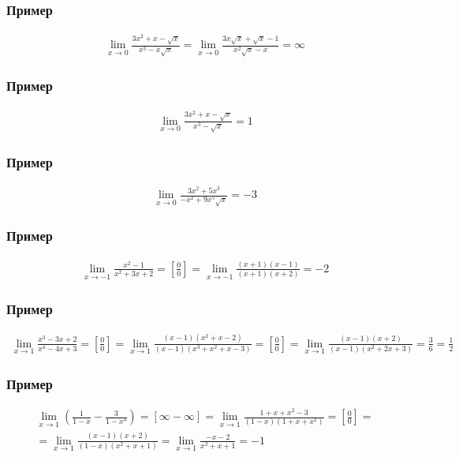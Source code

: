 \documentclass{article}
\begin{document}
\subsubsection{Пример}
\begin{gather*}
    \lim_{x \to 0} \frac{3x^2 + x - \sqrt{x}}{x^3 - x \sqrt{x}} =
    \lim_{x \to 0} \frac{3x \sqrt{x} + \sqrt{x} - 1}{x^2 \sqrt{x} - x} = \infty
\end{gather*}

\subsubsection{Пример}
\begin{gather*}
    \lim_{x \to 0} \frac{3x^2 + x - \sqrt{x}}{x^3 - \sqrt{x}} = 1
\end{gather*}

\subsubsection{Пример}
\begin{gather*}
    \lim_{x \to 0} \frac{3x^2 + 5x^3}{-x^2 + 9x^5 \sqrt{x}} = -3    
\end{gather*}

\subsubsection{Пример}
\begin{gather*}
    \lim_{x \to -1} \frac{x^2 - 1}{x^2 + 3x + 2} = 
    \left[ \frac{0}{0} \right] =
    \lim_{x \to -1} \frac{(x + 1)(x - 1)}{(x + 1)(x + 2)} = -2
\end{gather*}

\subsubsection{Пример}
\begin{gather*}
    \lim_{x \to 1} \frac{x^3 - 3x + 2}{x^4 - 4x + 3} =
    \left[ \frac{0}{0} \right] =
    \lim_{x \to 1} \frac{(x - 1)(x^2 + x - 2)}{(x - 1)(x^3 + x^2 + x - 3)} =
    \left[ \frac{0}{0} \right] =
    \lim_{x \to 1} \frac{(x - 1)(x + 2)}{(x - 1)(x^2 + 2x + 3)} =
    \frac{3}{6} = \frac{1}{2}
\end{gather*}

\subsubsection{Пример}
\begin{gather*}
    \lim_{x \to 1} \left( \frac{1}{1 - x} - \frac{3}{1 - x^3} \right) = 
    [\infty - \infty] =
    \lim_{x \to 1} \frac{1 + x + x^2 - 3}{(1 - x)(1 + x + x^2)} =
    \left[ \frac{0}{0} \right] = \\
    = \lim_{x \to 1} \frac{(x - 1)(x + 2)}{(1 - x)(x^2 + x + 1)} =
    \lim_{x \to 1} \frac{-x - 2}{x^2 + x + 1} = -1
\end{gather*}
\end{document}
